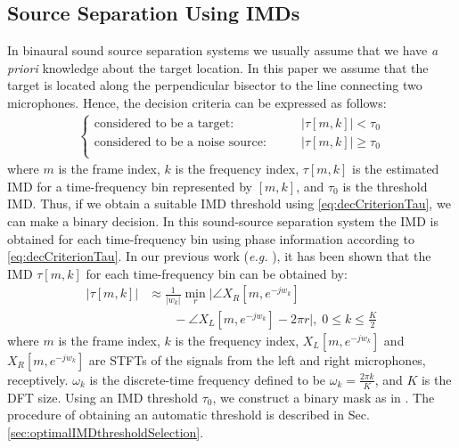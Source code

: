 \documentclass{article}
\begin{document}
\subsection{Source Separation Using IMDs}
	\label{sec:sourceSeparation}
	In   binaural sound source separation systems we usually assume that we have \emph{a priori}
knowledge about the target location. In this paper  we assume that the target is located along the 
perpendicular bisector to the line connecting two microphones. Hence, the 
decision criteria can be expressed as follows:
\begin{align}
	\begin{cases}
		\text{considered to be a target:} \qquad & |\tau[m, k]| < \tau_0 \\
        \text{considered to be a noise source:} \qquad & |\tau[m, k]| \ge \tau_0 \\	
	\end{cases}
		\label{eq:decCriterionTau}
\end{align}
where $m$ is the frame index, $k$ is the frequency index,   $\tau[m, k]$ is the estimated IMD for a time-frequency bin represented by $[m, k]$, and $\tau_0$ is the threshold IMD.  Thus, if we obtain a suitable
IMD threshold   using  \eqref{eq:decCriterionTau}, we can make a binary decision.
In this sound-source separation system the IMD is obtained for each time-frequency bin using phase information according to \eqref{eq:decCriterionTau}.  In our previous work (\emph{e.g.} \cite{C_Kim_INTERSPEECH_2010_1}), it has been shown that the IMD $\tau[m, k]$
for each time-frequency bin can be obtained by:
\begin{align} \label{eq:IMD_Estimate}
|\tau[m, k]|  & \approx  \frac{1}{|w_{k}|}   \min_r \Big|\angle{X_R[m, e^{-j w_k } ]} \nonumber \\
              & \qquad  - \angle{X_L[m, e^{-j w_k }]} - 2 \pi r \Big|, \; 0 \le k \le \frac{K}{2}
\end{align}
where $m$ is the frame index, $k$ is the frequency index, $X_L[m, e^{-j w_k }]$ and $X_R[m, e^{-j w_k } ]$ are
STFTs of the signals from the left and right microphones, receptively.
$\omega_k$ is the discrete-time frequency defined to be $\omega_k = \frac{2 \pi
k}{K}$, and $K$ is the DFT size. Using an IMD threshold $\tau_0$, we construct
a binary mask as in \cite{C_Kim_INTERSPEECH_2010_1}. The procedure of obtaining an automatic threshold is described in Sec. \ref{sec:optimalIMDthresholdSelection}. 
\end{document}
